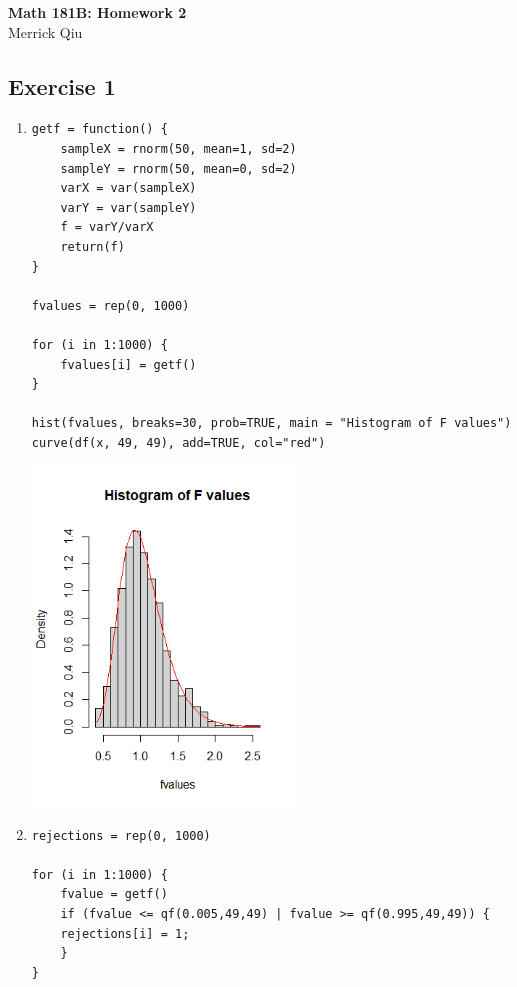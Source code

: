 \documentclass{article}
\begin{document}
\begin{center}
	\huge{\bf Math 181B: Homework 2} \\
	Merrick Qiu 
\end{center}

\subsection*{Exercise 1}
\begin{enumerate}
	\item \begin{lstlisting}
getf = function() {
	sampleX = rnorm(50, mean=1, sd=2)
	sampleY = rnorm(50, mean=0, sd=2)
	varX = var(sampleX)
	varY = var(sampleY)
	f = varY/varX
	return(f)
}

fvalues = rep(0, 1000)

for (i in 1:1000) {
	fvalues[i] = getf()
}

hist(fvalues, breaks=30, prob=TRUE, main = "Histogram of F values")
curve(df(x, 49, 49), add=TRUE, col="red")
	\end{lstlisting}
	\includegraphics[width=0.55\textwidth]{exercise1a.png}

	\item \begin{lstlisting}
rejections = rep(0, 1000)

for (i in 1:1000) {
	fvalue = getf()
	if (fvalue <= qf(0.005,49,49) | fvalue >= qf(0.995,49,49)) {
	rejections[i] = 1;
	} 
}


\end{lstlisting}
\end{enumerate}
\end{document}
